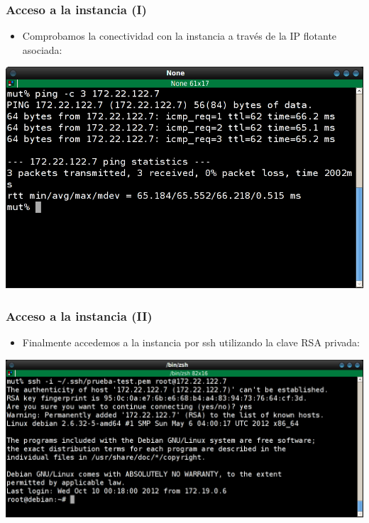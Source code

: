 \documentclass{beamer}
\begin{document}
\begin{frame}
  \frametitle{Acceso a la instancia (I)}
  \begin{itemize}
  \item Comprobamos la conectividad con la instancia a través de la IP flotante asociada:
  \end{itemize}
  \begin{center}
    \includegraphics[width=.7\textwidth]{../img/horizon10.png}    
  \end{center}
\end{frame}

\begin{frame}[fragile]
  \frametitle{Acceso a la instancia (II)}
  \begin{itemize}
  \item Finalmente accedemos a la instancia por ssh utilizando la clave RSA privada:
  \end{itemize}
  \begin{center}
    \includegraphics[width=.8\textwidth]{../img/horizon11.png}
  \end{center}
\end{frame}
\end{document}
